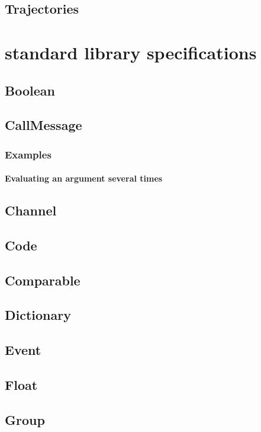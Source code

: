 \documentclass[openright,twoside,12pt]{report}
\begin{document}
\section{Trajectories}

\chapter{\us standard library specifications}
\label{chap:std}

\section{Boolean}
\section{CallMessage}
\label{sect:std-callmsg}
\subsection{Examples}
\subsubsection{Evaluating an argument several times}
\label{sect:std-callmsg-examples-several}
\section{Channel}
\section{Code}
\section{Comparable}
\label{sect:std-comparable}
\section{Dictionary}
\section{Event}

\section{Float}


\section{Group}
\end{document}
